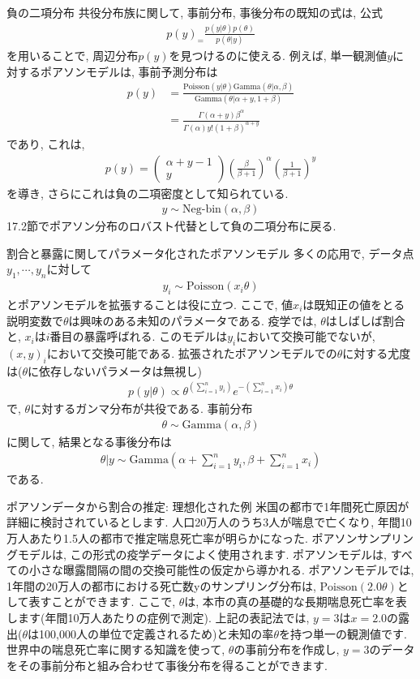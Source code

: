 \documentclass[10pt,dvipdfmx,a4]{beamer}
\newcommand{\eq}[1]{\begin{align}#1\end{align}}
\newcommand{\eqn}[1]{\begin{align*}#1\end{align*}}
\begin{document}

\begin{frame}{負の二項分布}
共役分布族に関して, 事前分布, 事後分布の既知の式は, 公式
\eqn{p(y)_=\frac{p(y|\theta)p(\theta)}{p(\theta|y)}}
を用いることで, 周辺分布$p(y)$を見つけるのに使える.
例えば, 単一観測値$y$に対するポアソンモデルは, 事前予測分布は
\eqn{p(y)&=\frac{\text{Poisson}(y|\theta)\text{Gamma}(\theta|\alpha,\beta)}{\text{Gamma}(\theta|\alpha+y,1+\beta)}\\
&=\frac{\Gamma(\alpha+y)\beta^{\alpha}}{\Gamma(\alpha)y!(1+\beta)^{\alpha+y}}}
であり, これは,
\eqn{p(y)=\left(\begin{array}{c}\alpha+y-1\\y\end{array}\right) \left(\frac{\beta}{\beta+1}\right)^{\alpha}\left(\frac{1}{\beta+1}\right)^y}
を導き, さらにこれは負の二項密度として知られている.
\eqn{y\sim \text{Neg-bin}(\alpha,\beta)}
17.2節でポアソン分布のロバスト代替として負の二項分布に戻る.
\end{frame}


\begin{frame}{割合と暴露に関してパラメータ化されたポアソンモデル}
多くの応用で, データ点$y_1,\cdots,y_n$に対して
\eq{y_i\sim\text{Poisson}(x_i\theta)}
とポアソンモデルを拡張することは役に立つ. 
ここで, 値$x_i$は既知正の値をとる説明変数で$\theta$は興味のある未知のパラメータである.
疫学では, $\theta$はしばしば割合と, $x_i$は$i$番目の暴露呼ばれる.
このモデルは$y_i$において交換可能でないが, $(x,y)_i$において交換可能である.
拡張されたポアソンモデルでの$\theta$に対する尤度は($\theta$に依存しないパラメータは無視し)
\eqn{p(y|\theta)\propto \theta^{(\sum_{i=1}^n y_i)}e^{-(\sum_{i=1}^n x_i)\theta}}
で, $\theta$に対するガンマ分布が共役である.
事前分布
\eqn{\theta\sim\text{Gamma}(\alpha,\beta)}
に関して, 結果となる事後分布は
\eq{\theta|y \sim \text{Gamma}\left(\alpha+\sum_{i=1}^n y_i, \beta+\sum_{i=1}^n x_i\right)}
である.
\end{frame}


\begin{frame}{ポアソンデータから割合の推定: 理想化された例}
米国の都市で1年間死亡原因が詳細に検討されているとします.
人口20万人のうち3人が喘息で亡くなり, 年間10万人あたり1.5人の都市で推定喘息死亡率が明らかになった.
ポアソンサンプリングモデルは, この形式の疫学データによく使用されます.
ポアソンモデルは, すべての小さな曝露間隔の間の交換可能性の仮定から導かれる.
ポアソンモデルでは, 1年間の20万人の都市における死亡数yのサンプリング分布は, $\text{Poisson}(2.0\theta)$として表すことができます.
ここで, $\theta$は, 本市の真の基礎的な長期喘息死亡率を表します(年間10万人あたりの症例で測定).
上記の表記法では, $y = 3$は$x = 2.0$の露出($\theta$は100,000人の単位で定義されるため)と未知の率$\theta$を持つ単一の観測値です.
世界中の喘息死亡率に関する知識を使って, $\theta$の事前分布を作成し, $y=3$のデータをその事前分布と組み合わせて事後分布を得ることができます.
\end{frame}
\end{document}
